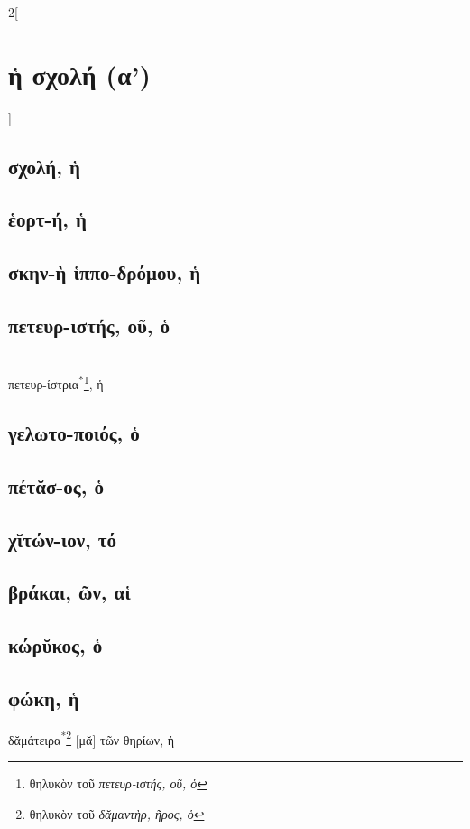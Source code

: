 \documentclass{book}
\begin{document}
\begin{multicols}{2}[\section{ἡ σχολή (α')}] 
\subsection{σχολή, ἡ}
\subsection{ἑορτ-ή, ἡ}
\subsection{σκην-ὴ ἱππο-δρόμου, ἡ}
\subsection{πετευρ-ιστής, οῦ, ὁ}  ~\\
πετευρ-ίστρια\textsuperscript{*}\footnote{θηλυκὸν τοῦ \emph{πετευρ-ιστής, οῦ, ὁ}}, ἡ 
\subsection{γελωτο-ποιός, ὁ}
\subsection{πέτᾰσ-ος, ὁ}
\subsection{χῐτών-ιον, τό}         
\subsection{βράκαι, ῶν, αἱ}
\subsection{κώρῠκος, ὁ}
\subsection{φώκη, ἡ}
δᾰμάτειρα\textsuperscript{*}\footnote{θηλυκὸν τοῦ \emph{δᾰμαντὴρ, ῆρος, ὁ}} [μᾰ] τῶν θηρίων, ἡ

\end{multicols}
\end{document}
